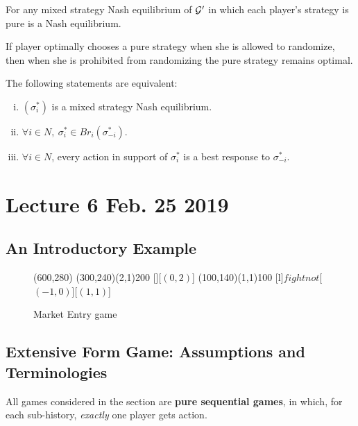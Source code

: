 \documentclass[11pt]{article}
\begin{document}
		\begin{proposition}
			For any mixed strategy Nash equilibrium of $\mathcal{{G}}'$ in which each player's strategy is pure is a Nash equilibrium.
		\end{proposition}
		
		\begin{remark}
			If player optimally chooses a pure strategy when she is allowed to randomize, then when she is prohibited from randomizing the pure strategy remains optimal.
		\end{remark}
		
		\begin{proposition}
			The following statements are equivalent:
			\begin{enumerate}[(i)]
				\item $(\sigma^*_i)$ is a mixed strategy Nash equilibrium.
				\item $\forall i \in N,\ \sigma^*_i \in Br_i(\sigma_{-i}^*)$.
				\item $\forall i \in N$, every action in support of $\sigma^*_i$ is a best response to $\sigma_{-i}^*$.
			\end{enumerate} 
		\end{proposition}
	
	\section{Lecture 6 Feb. 25 2019}
		\subsection{An Introductory Example}
			\begin{figure}[htb]
			\hspace*{\fill}
			\begin{egame}(600,280)
			\putbranch(300,240)(2,1){200}
			[][$(0,2)$]
			\putbranch(100,140)(1,1){100}
			[l]{$fight$}{$not$}[$(-1,0)$][$(1,1)$]
			\end{egame}
			\hspace*{\fill}
			\caption[]{Market Entry game}
		\end{figure}
		\subsection{Extensive Form Game: Assumptions and Terminologies}
			\begin{assumption}
				All games considered in the section are \textbf{pure sequential games}, in which, for each sub-history, \emph{exactly} one player gets action. 
			\end{assumption}
			
\end{document}

